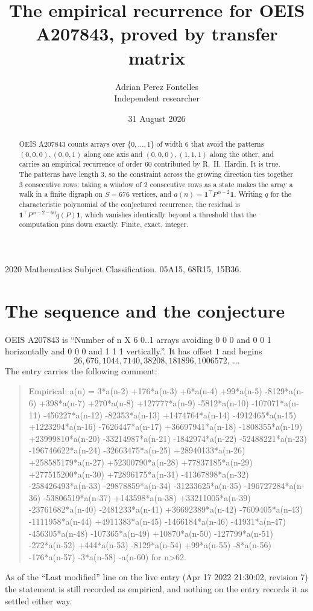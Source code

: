 \documentclass[11pt,a4paper]{article}
\title{The empirical recurrence for OEIS A207843, proved by transfer matrix}
\author{Adrian Perez Fontelles\\ \small Independent researcher}
\date{31 August 2026}
\theoremstyle{plain}
\theoremstyle{definition}
\begin{document}
\maketitle

\begin{abstract}
OEIS A207843 counts arrays over $\{0,\dots,1\}$ of width $6$ that avoid the patterns
$(0,0,0), (0,0,1)$ along one axis and $(0,0,0), (1,1,1)$ along the other, and carries an empirical recurrence of
order $60$ contributed by R.~H.~Hardin. It is true. The patterns have length $3$, so
the constraint across the growing direction ties together $3$ consecutive rows: taking a
window of $2$ consecutive rows as a state makes the array a walk in a finite digraph
on $S=676$ vertices, and $a(n)=\mathbf{1}^{\!\top}P^{\,n-2}\mathbf{1}$. Writing $q$
for the characteristic polynomial of the conjectured recurrence, the residual is
$\mathbf{1}^{\!\top}P^{\,n-2-60}q(P)\mathbf{1}$, which vanishes identically
beyond a threshold that the computation pins down exactly. Finite, exact, integer.
\end{abstract}

\noindent\small 2020 Mathematics Subject Classification. 05A15, 68R15, 15B36.\normalsize

\section{The sequence and the conjecture}

OEIS A207843 is ``Number of n X 6 0..1 arrays avoiding 0 0 0 and 0 0 1 horizontally and 0 0 0 and 1 1 1 vertically.''. It has offset
$1$ and begins
\[
26, 676, 1044, 7140, 38208, 181896, 1006572,\ \dots
\]
The entry carries the following comment:
\begin{quote}\small
Empirical: a(n) = 3*a(n-2) +176*a(n-3) +6*a(n-4) +99*a(n-5) -8129*a(n-6) +398*a(n-7) +270*a(n-8) +127777*a(n-9) -5812*a(n-10) -107071*a(n-11) -456227*a(n-12) -82353*a(n-13) +1474764*a(n-14) -4912465*a(n-15) +1223294*a(n-16) -7626447*a(n-17) +36697941*a(n-18) -1808355*a(n-19) +23999810*a(n-20) -33214987*a(n-21) -1842974*a(n-22) -52488221*a(n-23) -196746622*a(n-24) -32663475*a(n-25) +28940133*a(n-26) +258585179*a(n-27) +52300790*a(n-28) +77837185*a(n-29) +277515200*a(n-30) +72896175*a(n-31) -41367898*a(n-32) -258426493*a(n-33) -29878859*a(n-34) -31233625*a(n-35) -196727284*a(n-36) -53806519*a(n-37) +143598*a(n-38) +33211005*a(n-39) -23761682*a(n-40) -2481233*a(n-41) +36692389*a(n-42) -7609405*a(n-43) -1111958*a(n-44) +4911383*a(n-45) -1466184*a(n-46) -41931*a(n-47) -456305*a(n-48) -107365*a(n-49) +10870*a(n-50) -127799*a(n-51) -272*a(n-52) +444*a(n-53) -8129*a(n-54) +99*a(n-55) -8*a(n-56) -176*a(n-57) -3*a(n-58) -a(n-60) for n>62.
\end{quote}
As of the ``Last modified'' line on the live entry (Apr 17 2022 21:30:02, revision
7) the statement is still recorded as empirical, and nothing on the entry
records it as settled either way.
\end{document}
